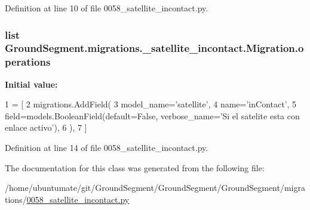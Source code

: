 Definition at line 10 of file 0058\+\_\+satellite\+\_\+incontact.\+py.

\hypertarget{class_ground_segment_1_1migrations_1_10058__satellite__incontact_1_1_migration_a26d6637573e44638a98749b847ba469e}{}
\subsubsection[{operations}]{\setlength{\rightskip}{0pt plus 5cm}list Ground\+Segment.\+migrations.\+\_\+satellite\+\_\+incontact.\+Migration.\+operations\hspace{0.3cm}{\ttfamily [static]}}\label{class_ground_segment_1_1migrations_1_10058__satellite__incontact_1_1_migration_a26d6637573e44638a98749b847ba469e}
{\bfseries Initial value\+:}
\begin{DoxyCode}
1 = [
2         migrations.AddField(
3             model\_name=\textcolor{stringliteral}{'satellite'},
4             name=\textcolor{stringliteral}{'inContact'},
5             field=models.BooleanField(default=\textcolor{keyword}{False}, verbose\_name=\textcolor{stringliteral}{'Si el satelite esta con enlace activo'}),
6         ),
7     ]
\end{DoxyCode}


Definition at line 14 of file 0058\+\_\+satellite\+\_\+incontact.\+py.



The documentation for this class was generated from the following file\+:\begin{DoxyCompactItemize}
\item 
/home/ubuntumate/git/\+Ground\+Segment/\+Ground\+Segment/\+Ground\+Segment/migrations/\hyperlink{0058__satellite__incontact_8py}{0058\+\_\+satellite\+\_\+incontact.\+py}\end{DoxyCompactItemize}
